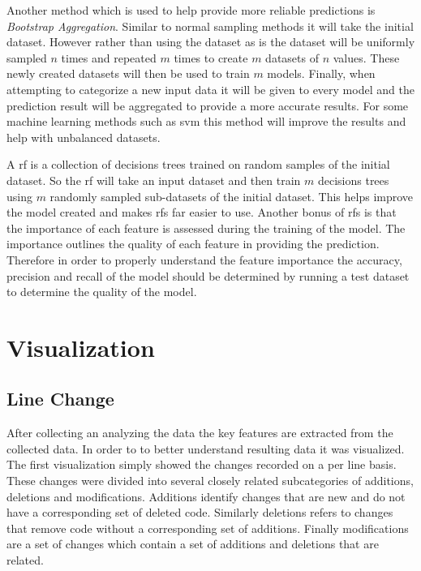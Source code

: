 Another method which is used to help provide more reliable predictions is \textit{Bootstrap Aggregation}. Similar to normal sampling methods it will take the initial dataset. However rather than using the dataset as is the dataset will be uniformly sampled $n$ times and repeated $m$ times to create $m$ datasets of $n$ values. These newly created datasets will then be used to train $m$ models. Finally, when attempting to categorize a new input data it will be given to every model and the prediction result will be aggregated to provide a more accurate results. For some machine learning methods such as \gls{svm} this method will improve the results and help with unbalanced datasets.

A \gls{rf} is a collection of decisions trees trained on random samples of the initial dataset. So the \gls{rf} will take an input dataset and then train $m$ decisions trees using $m$ randomly sampled sub-datasets of the initial dataset. This helps improve the model created and makes \gls{rf}s far easier to use. Another bonus of \gls{rf}s is that the importance of each feature is assessed during the training of the model. The importance outlines the quality of each feature in providing the prediction. Therefore in order to properly understand the feature importance the accuracy, precision and recall of the model should be determined by running a test dataset to determine the quality of the model.

\section{Visualization}

\subsection{Line Change}

After collecting an analyzing the data the key features are extracted from the collected data. In order to to better understand resulting data it was visualized. The first visualization simply showed the changes recorded on a per line basis. These changes were divided into several closely related subcategories of additions, deletions and modifications. Additions identify changes that are new and do not have a corresponding set of deleted code. Similarly deletions refers to changes that remove code without a corresponding set of additions. Finally modifications are a set of changes which contain a set of additions and deletions that are related.

